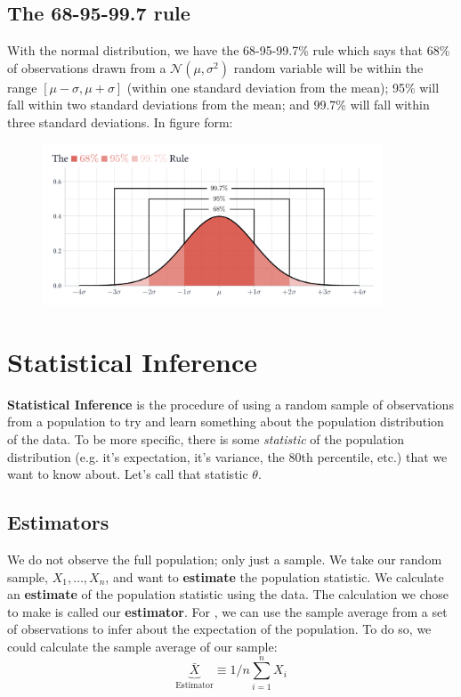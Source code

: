\documentclass[12pt]{article}
\begin{document}
\subsection*{The 68-95-99.7 rule}

With the normal distribution, we have the 68-95-99.7\% rule which says that 68\% of observations drawn from a $\mathcal{N}(\mu, \sigma^2)$ random variable will be within the range $\left[\mu - \sigma, \mu + \sigma\right]$ (within one standard deviation from the mean); 95\% will fall within two standard deviations from the mean; and 99.7\% will fall within three standard deviations. In figure form: 
\begin{figure}[h!]
  \begin{center}
    \includegraphics[width=0.9\textwidth]{figures/68_95_99.pdf}
  \end{center}
\end{figure}







\section{Statistical Inference}

\textbf{Statistical Inference} is the procedure of using a random sample of observations from a population to try and learn something about the population distribution of the data. To be more specific, there is some \emph{statistic} of the population distribution (e.g. it's expectation, it's variance, the 80th percentile, etc.) that we want to know about. Let's call that statistic $\theta$. 

\subsection*{Estimators}

We do not observe the full population; only just a sample. We take our random sample, $X_1, \dots, X_n$, and want to \textbf{estimate} the population statistic. We calculate an \textbf{estimate} of the population statistic using the data. The calculation we chose to make is called our \textbf{estimator}. For , we can use the sample average from a set of observations to infer about the expectation of the population. To do so, we could calculate the sample average of our sample:
$$
  \underbrace{\bar{X}}_{\text{Estimator}} \equiv 1/n \sum_{i=1}^n X_i
$$
\end{document}

